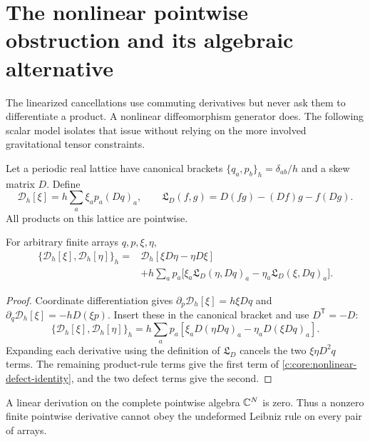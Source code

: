 
\section{The nonlinear pointwise obstruction and its algebraic alternative}
\label{c:core:nonlinear-obstruction}

The linearized cancellations use commuting derivatives but never ask
them to differentiate a product. A nonlinear diffeomorphism generator
does. The following scalar model isolates that issue without relying
on the more involved gravitational tensor constraints.

Let a periodic real lattice have canonical brackets
$\{q_a,p_b\}_h=\delta_{ab}/h$ and a skew matrix $D$. Define
\[
 \mathcal D_h[\xi]=h\sum_a\xi_ap_a(Dq)_a,
 \qquad
 \mathfrak L_D(f,g)=D(fg)-(Df)g-f(Dg).
\]
All products on this lattice are pointwise.

\begin{proposition}
\label{c:core:nonlinear-defect}
For arbitrary finite arrays $q,p,\xi,\eta$,
\begin{align}
 \{\mathcal D_h[\xi],\mathcal D_h[\eta]\}_h
 ={}&\mathcal D_h[\xi D\eta-\eta D\xi]\nonumber\\
 &+h\sum_ap_a\big[
 \xi_a\mathfrak L_D(\eta,Dq)_a
 -\eta_a\mathfrak L_D(\xi,Dq)_a\big].
 \label{c:core:nonlinear-defect-identity}
\end{align}
\end{proposition}

\begin{proof}
Coordinate differentiation gives
$\partial_p\mathcal D_h[\xi]=h\xi Dq$ and
$\partial_q\mathcal D_h[\xi]=-hD(\xi p)$.
Insert these in the canonical bracket and use $D^{\mathsf T}=-D$:
\[
 \{\mathcal D_h[\xi],\mathcal D_h[\eta]\}_h
 =h\sum_ap_a\left[\xi_aD(\eta Dq)_a
                  -\eta_aD(\xi Dq)_a\right].
\]
Expanding each derivative using the definition of $\mathfrak L_D$
cancels the two $\xi\eta D^2q$ terms. The remaining product-rule
terms give the first term of
\eqref{c:core:nonlinear-defect-identity}, and the two defect terms
give the second.
\end{proof}

\begin{theorem}
\label{c:core:pointwise-no-go}
A linear derivation on the complete pointwise algebra $\mathbb C^N$ is zero.
Thus a nonzero finite pointwise derivative cannot obey the undeformed
Leibniz rule on every pair of arrays.
\end{theorem}

